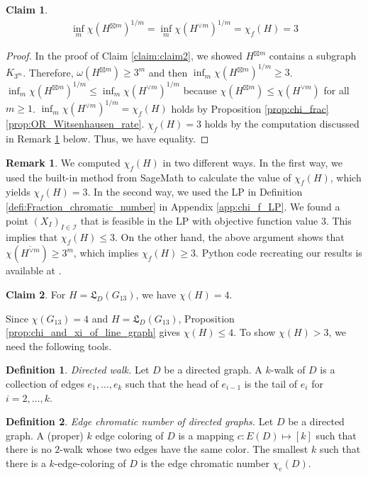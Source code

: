 \documentclass[journal, onecolumn, draftcls]{IEEEtran}
\theoremstyle{definition}
\newtheorem{claim}{Claim}
\newtheorem{remark}{Remark}
\newtheorem{definition}{Definition}
\newcommand{\calI}{\mathcal{I}}
\newcommand{\frL}{\mathfrak{L}}
\newcommand{\meng}[1]{\marginpar{+}{\bf Ruoyu's remark}: {\em #1}}
\newcommand{\aditya}[1]{\marginpar{+}{\bf Aditya's remark}: {\em #1}}
\begin{document}
\begin{claim}
    \begin{align*}
     \inf_m\chi( {H^{\boxtimes m}})^{1/m} =   \inf_m\chi( {H^{\lor m}})^{1/m} = \chi_f(H) = 3
    \end{align*}
\end{claim}
\begin{proof}
In the proof of Claim \ref{claim:claim2}, we showed $H^{\boxtimes m}$ contains a subgraph $K_{3^m}$. Therefore, $\omega(H^{\boxtimes m}) \ge 3^m$ and then  $\inf_m\chi( {H^{\boxtimes m}})^{1/m} \ge 3$. 
$\inf_m\chi( {H^{\boxtimes m}})^{1/m} \le   \inf_m\chi( {H^{\lor m}})^{1/m}$ because $\chi( H^{\boxtimes m})\le \chi(H^{\lor m})$ for all $m\ge 1$.
$\inf_m\chi( {H^{\lor m}})^{1/m} = \chi_f(H)$ holds by Proposition \ref{prop:chi_frac} \ref{prop:OR_Witsenhausen_rate}. $\chi_f(H) = 3$ holds by the computation discussed in Remark \ref{remark:chi_f_line_graph_computation} below. Thus, we have equality.   
\end{proof}
\begin{remark}\label{remark:chi_f_line_graph_computation}
We computed $\chi_f(H)$ in two different ways.  In the first way, we used the built-in method from SageMath\cite{sagemath} to calculate the value of $\chi_f(H)$, which yields $\chi_f(H)=3$.  In the second way, we used the LP in Definition \ref{defi:Fraction_chromatic_number} in Appendix \ref{app:chi_f_LP}. We found a point $(X_I)_{I\in \calI}$ that is feasible in the LP with objective function value $3$.   This implies that $\chi_f(H) \leq 3$. On the other hand, the above argument shows that $\chi(\overline{H^{\lor m}}) \ge 3^m$, which implies $\chi_f(H) \ge 3$. Python code recreating our results is available at \cite{meng2024github}.
\end{remark}

   

\begin{claim} \label{claim:chi(L(G13)=4} For $H = \frL_D(G_{13})$, we have $\chi(H) =4$.
\end{claim} 

Since $\chi( {G_{13}}) = 4$ \cite{ManinskaR16} and $H = \frL_D(G_{13})$, Proposition \ref{prop:chi_and_xi_of_line_graph} gives $\chi( {H}) \le 4$. To show $\chi(H) >3$, we need the following tools.
\begin{definition}{\it Directed walk.} 
Let $D$ be a directed graph. A $k$-walk of $D$ is a collection of edges $e_1,\dots, e_k$ such that  the head of $e_{i-1}$ is the tail of $e_i$ for $i=2,\dots,k$. 
\end{definition}
\begin{definition}{\it  Edge chromatic number of directed graphs.}  %
Let $D$ be a directed graph. A (proper) $k$ edge coloring of $D$ is  a mapping $c: E(D)\mapsto [k]$ such that  there is no $2$-walk whose two edges have the same color. The smallest $k$ such that  there is a $k$-edge-coloring of $D$ is the edge chromatic number $\chi_e(D)$.
\end{definition}
\end{document}
